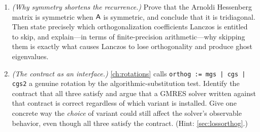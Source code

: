 \begin{enumerate}[nosep]
  with $\vq_1 = (1,0,0)^{\!\top}$. Compute $\alpha_1, \beta_1, \vq_2, \alpha_2,
  \beta_2, \vq_3$, assemble $\mat{T}_2$, and verify that $\vq_3$ is automatically
  orthogonal to $\vq_1$ even though you never projected against $\vq_1$ in step~2.
  \item \emph{(Why symmetry shortens the recurrence.)} Prove that the Arnoldi
  Hessenberg matrix is symmetric when $\mathsf{A}$ is symmetric, and conclude that it is
  tridiagonal. Then state precisely which orthogonalization coefficients Lanczos is
  entitled to skip, and explain---in terms of finite-precision arithmetic---why
  skipping them is exactly what causes Lanczos to lose orthogonality and produce ghost
  eigenvalues.
  \item \emph{(The contract as an interface.)} \cref{ch:rotations} calls
  \lstinline[style=l4style]@orthog := mgs | cgs | cgs2@ a genuine rotation by the
  algorithmic-substitution test. Identify the contract that all three satisfy and
  argue that a GMRES solver written against that contract is correct regardless of
  which variant is installed. Give one concrete way the \emph{choice} of variant could
  still affect the solver's observable behavior, even though all three satisfy the
  contract. (Hint: \cref{sec:lossorthog}.)
\end{enumerate}
